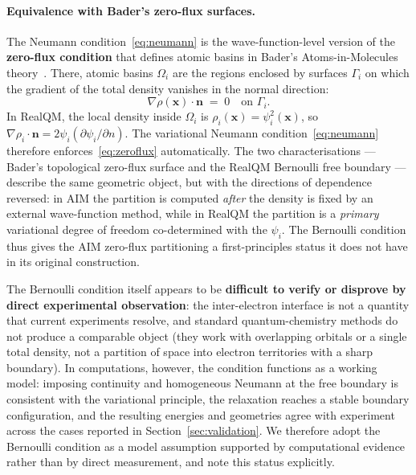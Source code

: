 \documentclass[11pt]{article}
\begin{document}
\paragraph{Equivalence with Bader's zero-flux surfaces.}
The Neumann condition~\eqref{eq:neumann} is the wave-function-level version of the \textbf{zero-flux condition} that defines atomic basins in Bader's Atoms-in-Molecules theory~\cite{Bader90}. There, atomic basins $\Omega_i$ are the regions enclosed by surfaces $\Gamma_i$ on which the gradient of the total density vanishes in the normal direction:
\begin{equation}\label{eq:zeroflux}
\nabla \rho(\mathbf{x}) \cdot \mathbf{n} \;=\; 0 \quad \text{on } \Gamma_i.
\end{equation}
In RealQM, the local density inside $\Omega_i$ is $\rho_i(\mathbf{x}) = \psi_i^2(\mathbf{x})$, so $\nabla \rho_i \cdot \mathbf{n} = 2\psi_i (\partial \psi_i/\partial n)$. The variational Neumann condition~\eqref{eq:neumann} therefore enforces~\eqref{eq:zeroflux} automatically. The two characterisations --- Bader's topological zero-flux surface and the RealQM Bernoulli free boundary --- describe the same geometric object, but with the directions of dependence reversed: in AIM the partition is computed \emph{after} the density is fixed by an external wave-function method, while in RealQM the partition is a \emph{primary} variational degree of freedom co-determined with the $\psi_i$. The Bernoulli condition thus gives the AIM zero-flux partitioning a first-principles status it does not have in its original construction.

The Bernoulli condition itself appears to be \textbf{difficult to verify or disprove by direct experimental observation}: the inter-electron interface is not a quantity that current experiments resolve, and standard quantum-chemistry methods do not produce a comparable object (they work with overlapping orbitals or a single total density, not a partition of space into electron territories with a sharp boundary). In computations, however, the condition functions as a working model: imposing continuity and homogeneous Neumann at the free boundary is consistent with the variational principle, the relaxation reaches a stable boundary configuration, and the resulting energies and geometries agree with experiment across the cases reported in Section~\ref{sec:validation}. We therefore adopt the Bernoulli condition as a model assumption supported by computational evidence rather than by direct measurement, and note this status explicitly.
\end{document}
